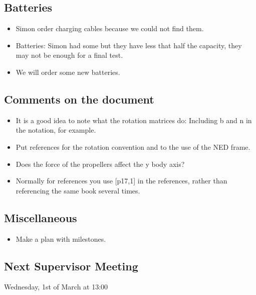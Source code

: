 \subsection{Batteries}
\begin{itemize}
	\item Simon order charging cables because we could not find them.
	\item Batteries: Simon had some but they have less that half the capacity, they may not be enough for a final test. 
	\item We will order some new batteries.
\end{itemize}
\subsection{Comments on the document}
\begin{itemize}
	\item It is a good idea to note what the rotation matrices do: Including b and n in the notation, for example.
	\item Put references for the rotation convention and to the use of the NED frame.
	\item Does the force of the propellers affect the y body axis?
	\item Normally for references you use [p17,1] in the references, rather than referencing the same book several times.
\end{itemize}
\subsection{Miscellaneous}
\begin{itemize}
	\item Make a plan with milestones.
\end{itemize}
\subsection{Next Supervisor Meeting}
Wednesday, 1st of March at 13:00

